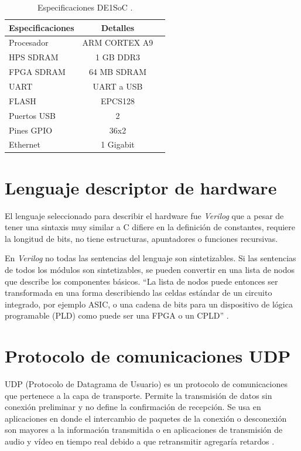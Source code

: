 \begin{table}[h]
\centering
\caption[Especificaciones DE1SoC]{Especificaciones DE1SoC \protect\footnotemark.}
\begin{tabular}{l c c}
\toprule
\textbf{Especificaciones}& \textbf{Detalles}\\
\midrule 


Procesador & ARM CORTEX A9\\
HPS SDRAM & 1 GB DDR3\\
FPGA SDRAM & 64 MB SDRAM\\
UART & UART a USB\\
FLASH & EPCS128\\
Puertos USB & 2\\
Pines GPIO & 36x2\\
Ethernet & 1 Gigabit\\


\bottomrule
\hline
\end{tabular}
\label{tab:DE1SOCTABLA}
\end{table}



\section{Lenguaje descriptor de hardware}

El lenguaje seleccionado para describir el hardware fue \textit{Verilog} que a pesar de tener una sintaxis muy similar a C difiere en la definición de constantes, requiere la longitud de bits, no tiene estructuras, apuntadores o funciones recursivas. 

En \textit{Verilog} no todas las sentencias del lenguaje son sintetizables. Si las sentencias de todos los módulos son sintetizables, se pueden convertir en una lista de nodos que describe los componentes básicos. ``La lista de nodos puede entonces ser transformada en una forma describiendo las celdas estándar de un circuito integrado, por ejemplo ASIC, o una cadena de bits para un dispositivo de lógica programable (PLD) como puede ser una FPGA o un CPLD'' \citep{WIKIVERILOG}.




\section{Protocolo de comunicaciones UDP}
UDP (Protocolo de Datagrama de Usuario) es un protocolo de comunicaciones que pertenece a la capa de transporte. Permite la transmisión de datos sin conexión preliminar y no define la confirmación de recepción. Se usa en aplicaciones en donde el intercambio de paquetes de la conexión o desconexión son mayores a la información transmitida o en aplicaciones de transmisión de audio y vídeo en tiempo real debido a que retransmitir agregaría retardos \citep{WIKIUDP}.





